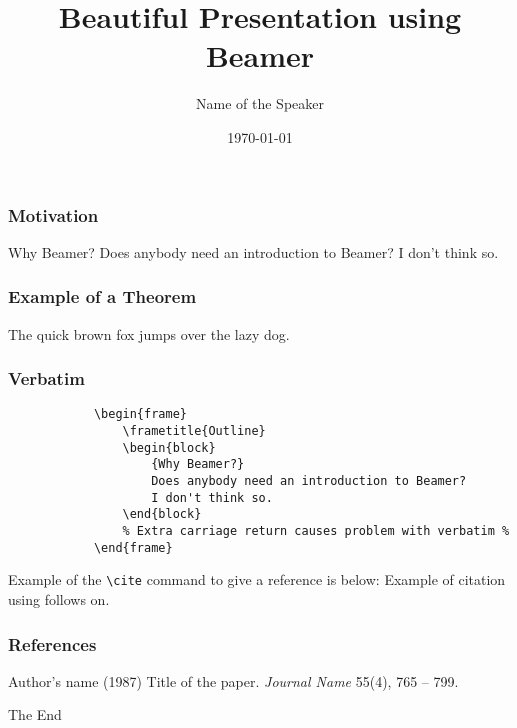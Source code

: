 \documentclass{beamer}
\title[Short title of the presentation]{Beautiful Presentation using Beamer}
\author{Name of the Speaker}
\institute[U of X]
{
University of [...] \\
\medskip
{\emph{email@domain.ca}}
}
\date{\today}
\begin{document}
\begin{frame}
    \titlepage
\end{frame}

\begin{frame}
    \frametitle{Motivation}
    \begin{block}
        {Why Beamer?}
        Does anybody need an introduction to Beamer? I don't think so.
    \end{block}
\end{frame}

\begin{frame}
    \frametitle{Example of a Theorem}
    \begin{theorem}
        The quick brown fox jumps over the lazy dog.
    \end{theorem}
\end{frame}

\begin{frame}[fragile]
    \frametitle{Verbatim}
    \begin{example}
        \begin{verbatim}
            \begin{frame}
                \frametitle{Outline}
                \begin{block}
                    {Why Beamer?}
                    Does anybody need an introduction to Beamer?
                    I don't think so.
                \end{block}
                % Extra carriage return causes problem with verbatim %
            \end{frame}
        \end{verbatim} 
    \end{example}
\end{frame}
 
\begin{frame}[fragile]
    Example of the \verb|\cite| command to give a reference is below:
    Example of citation using \cite{key1} follows on.
\end{frame}
 
\begin{frame}
    \frametitle{References}
    \footnotesize
    {
        \begin{thebibliography}{99}
             Author's name (1987)
            \newblock Title of the paper.
            \newblock \emph{Journal Name} 55(4), 765 -- 799.
        \end{thebibliography}
    }
\end{frame}
 
\begin{frame}
    \centerline{The End}
\end{frame}
\end{document}
